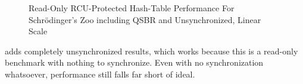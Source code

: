 \begin{figure}
\centering
{}
\caption{Read-Only RCU-Protected Hash-Table Performance For Schr\"odinger's Zoo including QSBR and Unsynchronized, Linear Scale}
\label{fig:datastruct:Read-Only RCU-Protected Hash-Table Performance For Schroedinger's Zoo including QSBR and Unsynchronized; Linear Scale}
\end{figure}

adds completely unsynchronized results, which works because this
is a read-only benchmark with nothing to synchronize.
Even with no synchronization whatsoever, performance still falls far
short of ideal.

